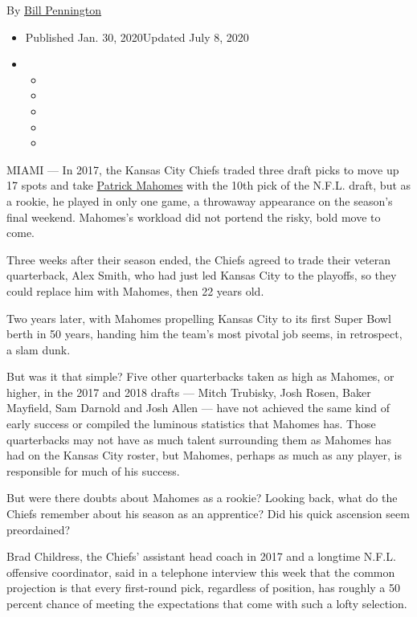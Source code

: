By \href{https://www.nytimes3xbfgragh.onion/by/bill-pennington}{Bill
Pennington}

\begin{itemize}
\item
  Published Jan. 30, 2020Updated July 8, 2020
\item
  \begin{itemize}
  \item
  \item
  \item
  \item
  \item
  \end{itemize}
\end{itemize}

MIAMI --- In 2017, the Kansas City Chiefs traded three draft picks to
move up 17 spots and take
\href{https://www.nytimes3xbfgragh.onion/2020/07/08/sports/football/patrick-mahomes-contract-guarantee.html}{Patrick
Mahomes} with the 10th pick of the N.F.L. draft, but as a rookie, he
played in only one game, a throwaway appearance on the season's final
weekend. Mahomes's workload did not portend the risky, bold move to
come.

Three weeks after their season ended, the Chiefs agreed to trade their
veteran quarterback, Alex Smith, who had just led Kansas City to the
playoffs, so they could replace him with Mahomes, then 22 years old.

Two years later, with Mahomes propelling Kansas City to its first Super
Bowl berth in 50 years, handing him the team's most pivotal job seems,
in retrospect, a slam dunk.

But was it that simple? Five other quarterbacks taken as high as
Mahomes, or higher, in the 2017 and 2018 drafts --- Mitch Trubisky, Josh
Rosen, Baker Mayfield, Sam Darnold and Josh Allen --- have not achieved
the same kind of early success or compiled the luminous statistics that
Mahomes has. Those quarterbacks may not have as much talent surrounding
them as Mahomes has had on the Kansas City roster, but Mahomes, perhaps
as much as any player, is responsible for much of his success.

But were there doubts about Mahomes as a rookie? Looking back, what do
the Chiefs remember about his season as an apprentice? Did his quick
ascension seem preordained?

Brad Childress, the Chiefs' assistant head coach in 2017 and a longtime
N.F.L. offensive coordinator, said in a telephone interview this week
that the common projection is that every first-round pick, regardless of
position, has roughly a 50 percent chance of meeting the expectations
that come with such a lofty selection.

